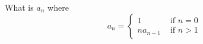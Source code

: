 What is $a_n$ where
\[
a_n = 
\begin{cases}
1 &\text{ if } n = 0 \\
na_{n-1} & \text{ if } n > 1
\end{cases}
\]
